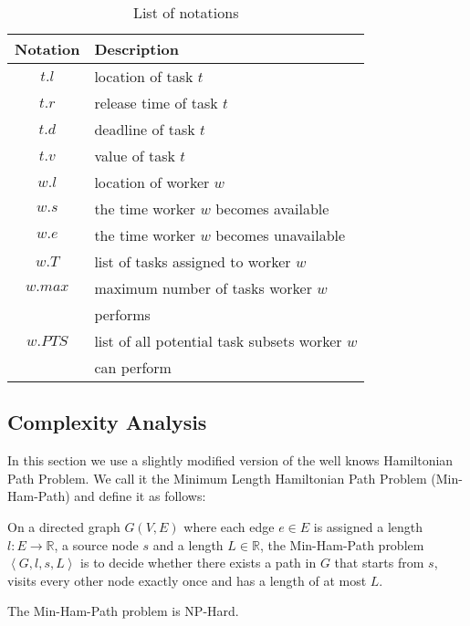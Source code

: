 \begin{table}
\label{tab:notation}
\begin{center}
\begin{tabular}{| c | l |} \hline
Notation	&	Description \\ \hline
$t.l$			&	location of task $t$ \\ \hline
$t.r$			&	release time of task $t$ \\ \hline
$t.d$		& 	deadline of task $t$ \\ \hline
$t.v$		&	value of task $t$ \\ \hline
$w.l$		&	location of worker $w$ \\ \hline
$w.s$		&	the time worker $w$ becomes available \\ \hline
$w.e$		&	the time worker $w$ becomes unavailable \\ \hline
$w.T$		&	list of tasks assigned to worker $w$ \\ \hline
$w.max$	&	maximum number of tasks worker $w$ \\
				&	performs \\ \hline
$w.PTS$	&	list of all potential task subsets worker $w$ \\
				&	can perform \\ \hline
\end{tabular}
\caption{List of notations}
\end{center}
\end{table}

\subsection{Complexity Analysis}

In this section we use a slightly modified version of the well knows Hamiltonian Path Problem. We call it the Minimum Length Hamiltonian Path Problem (Min-Ham-Path) and define it as follows:

\begin{definition}
On a directed graph $G(V,E)$ where each edge $e \in E$ is assigned a length $l: E \rightarrow \mathbb{R}$, a source node $s$ and a length $L \in \mathbb{R}$, the Min-Ham-Path problem $\left\langle G, l, s, L \right\rangle$ is to decide whether there exists a path in $G$ that starts from $s$, visits every other node exactly once and has a length of at most $L$.
\end{definition}

\begin{theorem}
\label{th:MinHam}
The Min-Ham-Path problem is NP-Hard.
\end{theorem}

